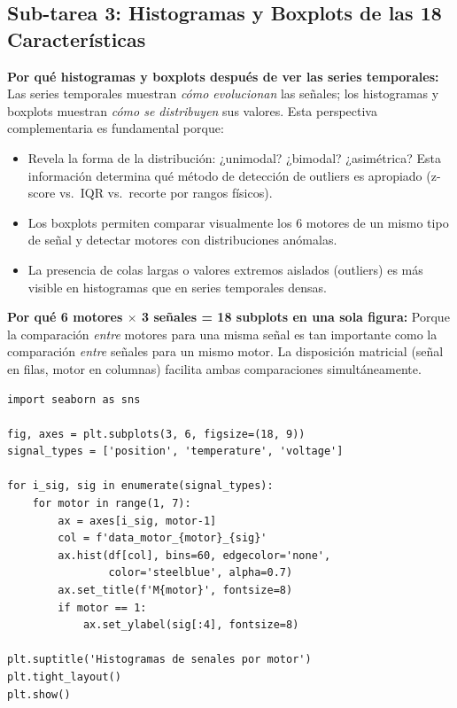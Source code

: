 \documentclass[12pt,a4paper]{article}
\begin{document}
\subsection{Sub-tarea 3: Histogramas y Boxplots de las 18 Características}

\begin{whybox}
\textbf{Por qué histogramas y boxplots después de ver las series temporales:}
Las series temporales muestran \emph{cómo evolucionan} las señales; los histogramas
y boxplots muestran \emph{cómo se distribuyen} sus valores. Esta perspectiva
complementaria es fundamental porque:
\begin{itemize}[leftmargin=1.5em]
  \item Revela la forma de la distribución: ¿unimodal? ¿bimodal? ¿asimétrica?
    Esta información determina qué método de detección de outliers es apropiado
    (z-score vs.\ IQR vs.\ recorte por rangos físicos).
  \item Los boxplots permiten comparar visualmente los 6 motores de un mismo tipo
    de señal y detectar motores con distribuciones anómalas.
  \item La presencia de colas largas o valores extremos aislados (outliers) es
    más visible en histogramas que en series temporales densas.
\end{itemize}

\textbf{Por qué 6 motores $\times$ 3 señales = 18 subplots en una sola figura:}
Porque la comparación \emph{entre} motores para una misma señal es tan importante
como la comparación \emph{entre} señales para un mismo motor. La disposición
matricial (señal en filas, motor en columnas) facilita ambas comparaciones
simultáneamente.
\end{whybox}

\begin{lstlisting}[caption={Generación de histogramas de las 18 características}, label={lst:hist}]
import seaborn as sns

fig, axes = plt.subplots(3, 6, figsize=(18, 9))
signal_types = ['position', 'temperature', 'voltage']

for i_sig, sig in enumerate(signal_types):
    for motor in range(1, 7):
        ax = axes[i_sig, motor-1]
        col = f'data_motor_{motor}_{sig}'
        ax.hist(df[col], bins=60, edgecolor='none',
                color='steelblue', alpha=0.7)
        ax.set_title(f'M{motor}', fontsize=8)
        if motor == 1:
            ax.set_ylabel(sig[:4], fontsize=8)

plt.suptitle('Histogramas de senales por motor')
plt.tight_layout()
plt.show()
\end{lstlisting}
\end{document}
